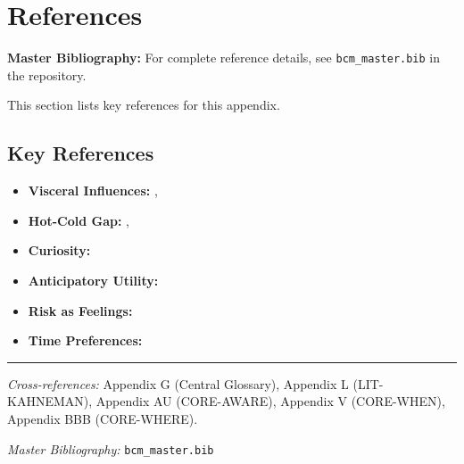 \section{References}
\label{sec:lo-references}

\begin{tcolorbox}[colback=blue!5!white, colframe=blue!75!black]
\textbf{Master Bibliography:} For complete reference details, see
\texttt{bcm\_master.bib} in the repository.

This section lists key references for this appendix.
\end{tcolorbox}

\vspace{0.5em}

\subsection{Key References}

\begin{itemize}[nosep]
    \item \textbf{Visceral Influences:} \citet{PAP-loewenstein1996out}, \citet{loewenstein2005visceral}
    \item \textbf{Hot-Cold Gap:} \citet{loewenstein2006hot}, \citet{loewenstein2000projecting}
    \item \textbf{Curiosity:} \citet{loewenstein1999curiosity}
    \item \textbf{Anticipatory Utility:} \citet{loewenstein1987emotions}
    \item \textbf{Risk as Feelings:} \citet{PAP-loewenstein2000emotions}
    \item \textbf{Time Preferences:} \citet{frederick2002time}
\end{itemize}

\nocite{bcm_master}



\vspace{1em}
\hrule
\vspace{0.5em}

\noindent\textit{Cross-references:}
Appendix G (Central Glossary),
Appendix L (LIT-KAHNEMAN),
Appendix AU (CORE-AWARE),
Appendix V (CORE-WHEN),
Appendix BBB (CORE-WHERE).

\noindent\textit{Master Bibliography:} \texttt{bcm\_master.bib}


